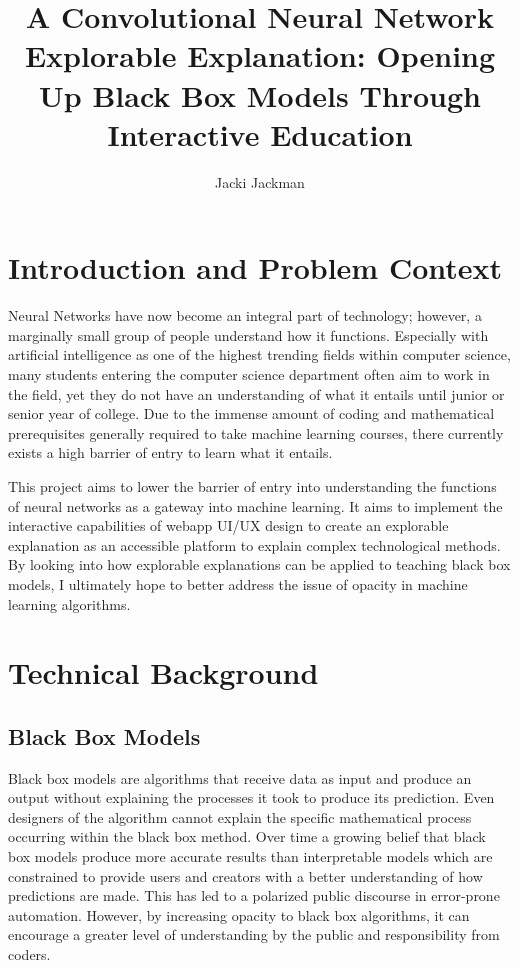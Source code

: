 \documentclass[10pt,twocolumn]{article}
\title{A Convolutional Neural Network Explorable Explanation: Opening Up Black Box Models Through Interactive Education}
\author{Jacki Jackman}
\affiliation{Occidental College}
\begin{document}
\maketitle

\section{Introduction and Problem Context}
Neural Networks have now become an integral part of technology; however, a marginally small group of people understand how it functions. Especially with artificial intelligence as one of the highest trending fields within computer science, many students entering the computer science department often aim to work in the field, yet they do not have an understanding of what it entails until junior or senior year of college. Due to the immense amount of coding and mathematical prerequisites generally required to take machine learning courses, there currently exists a high barrier of entry to learn what it entails. 

This project aims to lower the barrier of entry into understanding the functions of neural networks as a gateway into machine learning. It aims to implement the interactive capabilities of webapp UI/UX design to create an explorable explanation as an accessible platform to explain complex technological methods. By looking into how explorable explanations can be applied to teaching black box models, I ultimately hope to better address the issue of opacity in machine learning algorithms. \cite{MLOpacity}

\section{Technical Background}
\subsection{Black Box Models}
Black box models are algorithms that receive data as input and produce an output without explaining the processes it took to produce its prediction. Even designers of the algorithm cannot explain the specific mathematical process occurring within the black box method. Over time a growing belief that black box models produce more accurate results than interpretable models which are constrained to provide users and creators with a better understanding of how predictions are made. This has led to a polarized public discourse in error-prone automation. However, by increasing opacity to black box algorithms, it can encourage a greater level of understanding by the public and responsibility from coders. \cite{BlackBoxModels}
\end{document}
